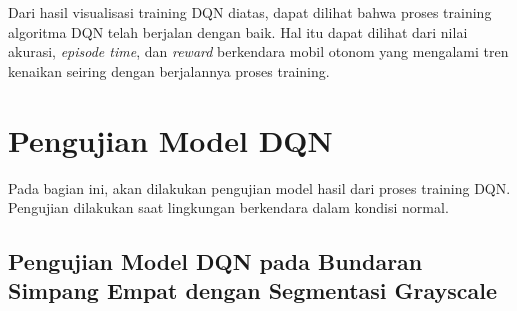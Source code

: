 \documentclass[conference]{IEEEtran}
\begin{document}
	Dari hasil visualisasi training DQN diatas, dapat dilihat bahwa proses training algoritma DQN telah berjalan dengan baik. Hal itu dapat dilihat dari nilai akurasi, \textit{episode time}, dan \textit{reward} berkendara mobil otonom yang mengalami tren kenaikan seiring dengan berjalannya proses training.
	
	\fi
	
	\section{Pengujian Model DQN}
	\label{sec:pengujian_model_dqn}
	
	Pada bagian ini, akan dilakukan pengujian model hasil dari proses training DQN. Pengujian dilakukan saat lingkungan berkendara dalam kondisi normal.
	
	\subsection{Pengujian Model DQN pada Bundaran Simpang Empat dengan Segmentasi Grayscale}
	\label{sec:pengujian_dqn_bundaran_simpangempat_segmentasi_grayscale}
	
\end{document}
